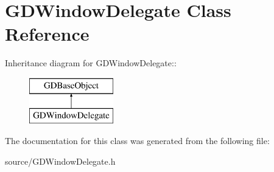 \hypertarget{interface_g_d_window_delegate}{
\section{GDWindowDelegate Class Reference}
\label{interface_g_d_window_delegate}
}
Inheritance diagram for GDWindowDelegate::\begin{figure}[H]
\begin{center}
\leavevmode
\includegraphics[height=2cm]{interface_g_d_window_delegate}
\end{center}
\end{figure}


The documentation for this class was generated from the following file:\begin{DoxyCompactItemize}
\item 
source/GDWindowDelegate.h\end{DoxyCompactItemize}
